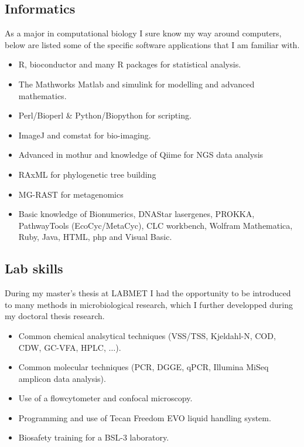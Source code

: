 \documentclass[a4paper,11pt,oneside]{article}
\begin{document}
\subsection*{Informatics}
As a major in computational biology I sure know my way around computers, below are listed some of the specific software applications that I am familiar with.
\begin{itemize}
	\item R, bioconductor and many R packages for statistical analysis.
	\item The Mathworks Matlab and simulink for modelling and advanced mathematics.
	\item Perl/Bioperl \& Python/Biopython for scripting.
	\item ImageJ and comstat for bio-imaging.
  \item Advanced in mothur and knowledge of Qiime for NGS data analysis
  \item RAxML for phylogenetic tree building
  \item MG-RAST for metagenomics
	\item Basic knowledge of Bionumerics, DNAStar lasergenes, PROKKA, PathwayTools (EcoCyc/MetaCyc), CLC workbench, Wolfram Mathematica,  Ruby, Java, HTML, php and Visual Basic.
\end{itemize}
\subsection*{Lab skills}
During my master's thesis at LABMET I had the opportunity to be introduced to many methods in microbiological research, which I further developped during my doctoral thesis research.
\begin{itemize}
	\item Common chemical analsytical techniques (VSS/TSS, Kjeldahl-N, COD, CDW, GC-VFA, HPLC, $\ldots$).
	\item Common molecular techniques (PCR, DGGE, qPCR, Illumina MiSeq amplicon data analysis).
	\item Use of a flowcytometer and confocal microscopy.
  \item Programming and use of Tecan Freedom EVO liquid handling system.
	\item Biosafety training for a BSL-3 laboratory.
\end{itemize}
\end{document}
